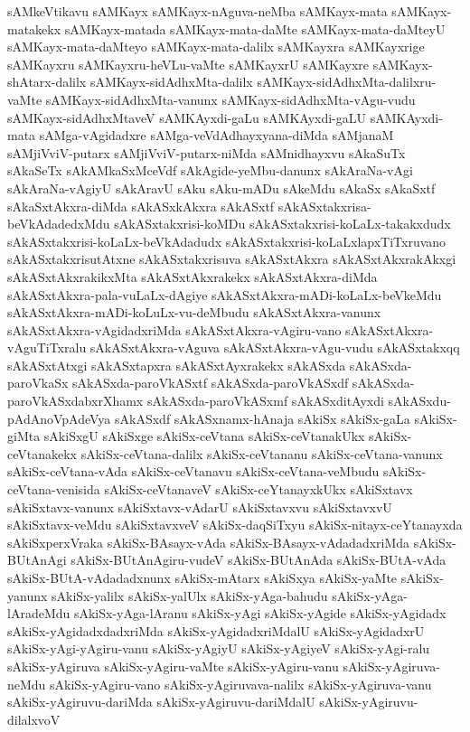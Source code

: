 {sAMkeVtikavu
sAMKayx
sAMKayx-nAguva-neMba
sAMKayx-mata
sAMKayx-matakekx
sAMKayx-matada
sAMKayx-mata-daMte
sAMKayx-mata-daMteyU
sAMKayx-mata-daMteyo
sAMKayx-mata-dalilx
sAMKayxra
sAMKayxrige
sAMKayxru
sAMKayxru-heVLu-vaMte
sAMKayxrU
sAMKayxre
sAMKayx-shAtarx-dalilx
sAMKayx-sidAdhxMta-dalilx
sAMKayx-sidAdhxMta-dalilxru-vaMte
sAMKayx-sidAdhxMta-vanunx
sAMKayx-sidAdhxMta-vAgu-vudu
sAMKayx-sidAdhxMtaveV
sAMKAyxdi-gaLu
sAMKAyxdi-gaLU
sAMKAyxdi-mata
sAMga-vAgidadxre
sAMga-veVdAdhayxyana-diMda
sAMjanaM
sAMjiVviV-putarx
sAMjiVviV-putarx-niMda
sAMnidhayxvu
sAkaSuTx
sAkaSeTx
sAkAMkaSxMceVdf
sAkAgide-yeMbu-danunx
sAkAraNa-vAgi
sAkAraNa-vAgiyU
sAkAravU
sAku
sAku-mADu
sAkeMdu
sAkaSx
sAkaSxtf
sAkaSxtAkxra-diMda
sAkASxkAkxra
sAkASxtf
sAkASxtakxrisa-beVkAdadedxMdu
sAkASxtakxrisi-koMDu
sAkASxtakxrisi-koLaLx-takakxdudx
sAkASxtakxrisi-koLaLx-beVkAdadudx
sAkASxtakxrisi-koLaLxlapxTiTxruvano
sAkASxtakxrisutAtxne
sAkASxtakxrisuva
sAkASxtAkxra
sAkASxtAkxrakAkxgi
sAkASxtAkxrakikxMta
sAkASxtAkxrakekx
sAkASxtAkxra-diMda
sAkASxtAkxra-pala-vuLaLx-dAgiye
sAkASxtAkxra-mADi-koLaLx-beVkeMdu
sAkASxtAkxra-mADi-koLuLx-vu-deMbudu
sAkASxtAkxra-vanunx
sAkASxtAkxra-vAgidadxriMda
sAkASxtAkxra-vAgiru-vano
sAkASxtAkxra-vAguTiTxralu
sAkASxtAkxra-vAguva
sAkASxtAkxra-vAgu-vudu
sAkASxtakxqq
sAkASxtAtxgi
sAkASxtapxra
sAkASxtAyxrakekx
sAkASxda
sAkASxda-paroVkaSx
sAkASxda-paroVkASxtf
sAkASxda-paroVkASxdf
sAkASxda-paroVkASxdabxrXhamx
sAkASxda-paroVkASxmf
sAkASxditAyxdi
sAkASxdu-pAdAnoVpAdeVya
sAkASxdf
sAkASxnamx-hAnaja
sAkiSx
sAkiSx-gaLa
sAkiSx-giMta
sAkiSxgU
sAkiSxge
sAkiSx-ceVtana
sAkiSx-ceVtanakUkx
sAkiSx-ceVtanakekx
sAkiSx-ceVtana-dalilx
sAkiSx-ceVtananu
sAkiSx-ceVtana-vanunx
sAkiSx-ceVtana-vAda
sAkiSx-ceVtanavu
sAkiSx-ceVtana-veMbudu
sAkiSx-ceVtana-venisida
sAkiSx-ceVtanaveV
sAkiSx-ceYtanayxkUkx
sAkiSxtavx
sAkiSxtavx-vanunx
sAkiSxtavx-vAdarU
sAkiSxtavxvu
sAkiSxtavxvU
sAkiSxtavx-veMdu
sAkiSxtavxveV
sAkiSx-daqSiTxyu
sAkiSx-nitayx-ceYtanayxda
sAkiSxperxVraka
sAkiSx-BAsayx-vAda
sAkiSx-BAsayx-vAdadadxriMda
sAkiSx-BUtAnAgi
sAkiSx-BUtAnAgiru-vudeV
sAkiSx-BUtAnAda
sAkiSx-BUtA-vAda
sAkiSx-BUtA-vAdadadxnunx
sAkiSx-mAtarx
sAkiSxya
sAkiSx-yaMte
sAkiSx-yanunx
sAkiSx-yalilx
sAkiSx-yalUlx
sAkiSx-yAga-bahudu
sAkiSx-yAga-lAradeMdu
sAkiSx-yAga-lAranu
sAkiSx-yAgi
sAkiSx-yAgide
sAkiSx-yAgidadx
sAkiSx-yAgidadxdadxriMda
sAkiSx-yAgidadxriMdalU
sAkiSx-yAgidadxrU
sAkiSx-yAgi-yAgiru-vanu
sAkiSx-yAgiyU
sAkiSx-yAgiyeV
sAkiSx-yAgi-ralu
sAkiSx-yAgiruva
sAkiSx-yAgiru-vaMte
sAkiSx-yAgiru-vanu
sAkiSx-yAgiruva-neMdu
sAkiSx-yAgiru-vano
sAkiSx-yAgiruvava-nalilx
sAkiSx-yAgiruva-vanu
sAkiSx-yAgiruvu-dariMda
sAkiSx-yAgiruvu-dariMdalU
sAkiSx-yAgiruvu-dilalxvoV
}
